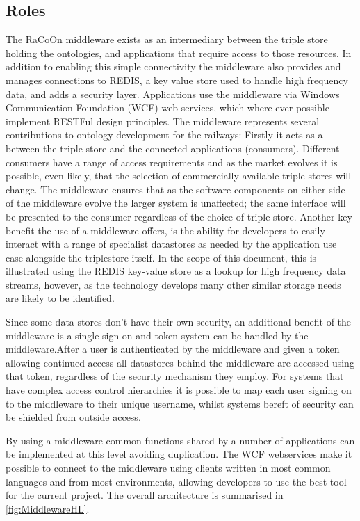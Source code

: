 \subsection{Roles}
The RaCoOn middleware exists as an intermediary between the triple store holding the ontologies, and applications that require access to those resources. In addition to enabling this simple connectivity the middleware also provides and manages connections to REDIS, a key value store used to handle high frequency data, and adds a security layer. Applications use the middleware via Windows Communication Foundation (WCF) web services, which where ever possible implement RESTFul design principles. The middleware represents several contributions to ontology development for the railways: Firstly it acts as a  between the triple store and the connected applications (consumers). Different consumers have a range of access requirements and as the market evolves it is possible, even likely, that the selection of commercially available triple stores will change. The middleware ensures that as the software components on either side of the middleware evolve the larger system is unaffected; the same interface will be presented to the consumer regardless of the choice of triple store. Another key benefit the use of a middleware offers, is the ability for developers to easily interact with a range of specialist datastores as needed by the application use case alongside the triplestore itself. In the scope of this document, this is illustrated using the REDIS key-value store as a lookup for high frequency data streams, however, as the technology develops many other similar storage needs are likely to be identified.

Since some data stores don't have their own security, an additional benefit of the middleware is a single sign on and token system can be handled by the middleware.After a user is authenticated by the middleware and given a token allowing continued access all datastores behind the middleware are accessed using that token, regardless of the security mechanism they employ. For systems that have complex access control hierarchies it is possible to map each user signing on to the middleware to their unique username, whilst systems bereft of security can be shielded from outside access. 

By using a middleware common functions shared by a number of applications can be implemented at this level avoiding duplication. The WCF webservices make it possible to connect to the middleware using clients written in most common languages and from most environments, allowing developers to use the best tool for the current project. The overall architecture is summarised in \autoref{fig:MiddlewareHL}.

